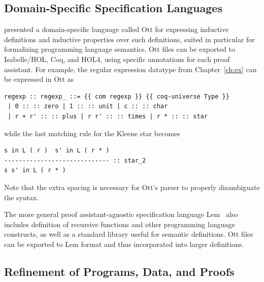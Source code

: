 \subsection{Domain-Specific Specification Languages}
\label{sec:dsspec}

\cite{Sewell2010} presented a domain-specific language called Ott for expressing inductive definitions and inductive properties over such definitions, suited in particular for formalizing programming language semantics. Ott files can be exported to Isabelle/HOL, Coq, and HOL4, using specific annotations for each proof assistant. For example, the regular expression datatype from Chapter~\ref{ch:ex} can be expressed in Ott as
\begin{lstlisting}
regexp :: regexp_ ::= {{ com regexp }} {{ coq-universe Type }}
 | 0 :: :: zero | 1 :: :: unit | c :: :: char
 | r + r' :: :: plus | r r' :: :: times | r * :: :: star
\end{lstlisting}
while the last matching rule for the Kleene star becomes
\begin{lstlisting}
s in L ( r )  s' in L ( r * )
----------------------------- :: star_2
s s' in L ( r * )
\end{lstlisting}
Note that the extra spacing is necessary for Ott's parser to properly disambiguate the syntax.

The more general proof assistant-agnostic specification language Lem~\citep{Mulligan2014} also includes definition of recursive functions and other programming language constructs,
as well as a standard library useful for semantic definitions. Ott files can be exported to Lem format and thus incorporated into larger definitions.

%

\subsection{Refinement of Programs, Data, and Proofs}
\label{sec:refinement}

